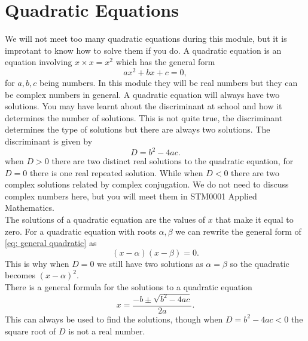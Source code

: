 \section{Quadratic Equations}
We will not meet too many quadratic equations during this module, but it is improtant to know how to solve them if you do. A quadratic equation is an equation involving $x\times x=x^{2}$ which has the general form
\begin{equation}
ax^{2}+bx+c=0,
\label{eq: general quadratic}
\end{equation}
for $a,b,c$ being numbers. In this module they will be real numbers but they can be complex numbers in general. A quadratic equation will always have two solutions. You may have learnt about the discriminant at school and how it determines the number of solutions. This is not quite true, the discriminant determines the type of solutions but there are always two solutions. The discriminant is given by
\begin{equation*}
D=b^{2}-4ac.
\end{equation*}
when $D>0$ there are two distinct real solutions to the quadratic equation, for $D=0$ there is one real repeated solution. While when $D<0$ there are two complex solutions related by complex conjugation. We do not need to discuss complex numbers here, but you will meet them in STM0001 Applied Mathematics.\\

The solutions of a quadratic equation are the values of $x$ that make it equal to zero. For a quadratic equation with roots $\alpha,\beta$ we can rewrite the general form of \cref{eq: general quadratic} as
\begin{equation*}
\left(x-\alpha\right)\left(x-\beta\right)=0.
\end{equation*}
This is why when $D=0$ we still have two solutions as $\alpha=\beta$ so the quadratic becomes $(x-\alpha)^{2}$.\\

There is a general formula for the solutions to a quadratic equation
\begin{equation}
x=\frac{-b\pm\sqrt{b^{2}-4ac}}{2a}.
\end{equation}
This can always be used to find the solutions, though when $D=b^{2}-4ac<0$ the square root of $D$ is not a real number. 
